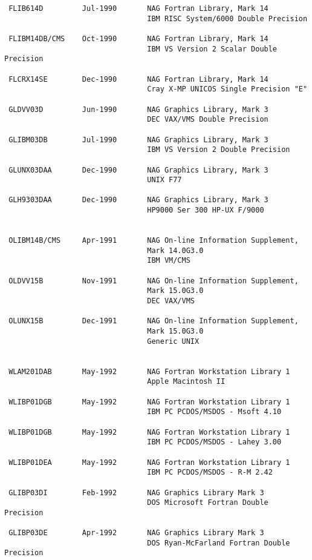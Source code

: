 \begin{verbatim}
 FLIB614D         Jul-1990       NAG Fortran Library, Mark 14
                                 IBM RISC System/6000 Double Precision
 
 FLIBM14DB/CMS    Oct-1990       NAG Fortran Library, Mark 14
                                 IBM VS Version 2 Scalar Double Precision
 
 FLCRX14SE        Dec-1990       NAG Fortran Library, Mark 14
                                 Cray X-MP UNICOS Single Precision "E"
 
 GLDVV03D         Jun-1990       NAG Graphics Library, Mark 3
                                 DEC VAX/VMS Double Precision
 
 GLIBM03DB        Jul-1990       NAG Graphics Library, Mark 3
                                 IBM VS Version 2 Double Precision
 
 GLUNX03DAA       Dec-1990       NAG Graphics Library, Mark 3
                                 UNIX F77
 
 GLH9303DAA       Dec-1990       NAG Graphics Library, Mark 3
                                 HP9000 Ser 300 HP-UX F/9000
 
 
 OLIBM14B/CMS     Apr-1991       NAG On-line Information Supplement,
                                 Mark 14.0G3.0
                                 IBM VM/CMS
 
 OLDVV15B         Nov-1991       NAG On-line Information Supplement,
                                 Mark 15.0G3.0
                                 DEC VAX/VMS
 
 OLUNX15B         Dec-1991       NAG On-line Information Supplement,
                                 Mark 15.0G3.0
                                 Generic UNIX
 
 
 WLAM201DAB       May-1992       NAG Fortran Workstation Library 1
                                 Apple Macintosh II
 
 WLIBP01DGB       May-1992       NAG Fortran Workstation Library 1
                                 IBM PC PCDOS/MSDOS - Msoft 4.10
 
 WLIBP01DGB       May-1992       NAG Fortran Workstation Library 1
                                 IBM PC PCDOS/MSDOS - Lahey 3.00
 
 WLIBP01DEA       May-1992       NAG Fortran Workstation Library 1
                                 IBM PC PCDOS/MSDOS - R-M 2.42
 
 GLIBP03DI        Feb-1992       NAG Graphics Library Mark 3
                                 DOS Microsoft Fortran Double Precision
 
 GLIBP03DE        Apr-1992       NAG Graphics Library Mark 3
                                 DOS Ryan-McFarland Fortran Double Precision
 
\end{verbatim}
 
